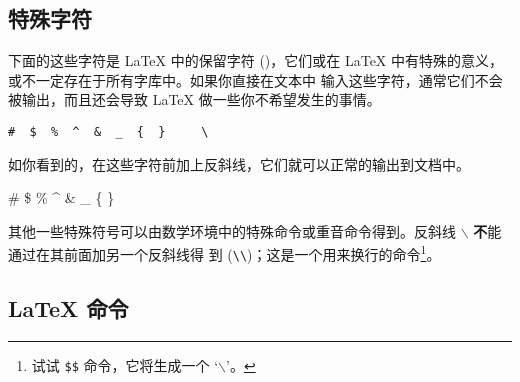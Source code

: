 \subsection{特殊字符}


下面的这些字符是 \LaTeX{} 中的保留字符 ()，它们或在 \LaTeX{} 中有特殊的意义，或不一定存在于所有字库中。如果你直接在文本中
输入这些字符，通常它们不会被输出，而且还会导致 \LaTeX{} 做一些你不希望发生的事情。
\begin{code}
\verb.#  $  %  ^  &  _  {  }     \ . %
\end{code}


如你看到的，在这些字符前加上反斜线，它们就可以正常的输出到文档中。

\begin{example}
\# \$ \% \^{} \& \_ \{ \} \ {}
\end{example}


其他一些特殊符号可以由数学环境中的特殊命令或重音命令得到。反斜线 $\backslash$ {\textbf
不}能通过在其前面加另一个反斜线得
到 (\verb|\\|)；这是一个用来换行的命令\footnote{试试 \texttt{\$}\texttt{\$} 命令，它将生成一个 `$\backslash$'。}。

\subsection{\LaTeX{} 命令}

